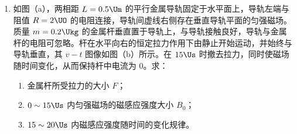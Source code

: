 \documentclass[\gkver]{gaokaozhenti}
\begin{document}
\begin{enumerate}
{（2）设拉力作用时间为 $t$，在此过程中球上升 $h$，末速度为 $v$，则 $h=\frac{1}{2}at^{2}$，$v=at$，由题意有 $-h=vt-\frac{1}{2}gt^{2}$，解得 $a=\frac{1}{3}g$，根据牛顿定律 $F-mg=ma$，解得 $F=\frac{4}{3}mg$。

（3）动能为 $\frac{W}{5}$ 时球的位置可能在 $h$ 的下方或上方。设球的位置在 $h$ 下方离地 $h'$ 处，$(F-mg)h'=\frac{1}{5}W$，而 $(F-mg)h=\frac{1}{4}W$，解得 $h'=\frac{4}{5}h$，重力势能 $E_{p}=mgh'=\frac{3}{5}W$。设球的位置在 $h$ 上方离地 $h''$ 处，由机械能守恒 $\frac{1}{5}W+mgh''=W$，因此 $E_{p}=mgh''=\frac{4}{5}W$。
}

\item
如图（a），两相距 $L=0.5\Um$ 的平行金属导轨固定于水平面上，导轨左端与阻值 $R=2\UO$ 的电阻连接，导轨间虚线右侧存在垂直导轨平面的匀强磁场。质量 $m=0.2\Ukg$ 的金属杆垂直置于导轨上，与导轨接触良好，导轨与金属杆的电阻可忽略。杆在水平向右的恒定拉力作用下由静止开始运动，并始终与导轨垂直，其 $v-t$ 图像如图（b）所示。在 $15\Us$ 时撤去拉力，同时使磁场随时间变化，从而保持杆中电流为 0。求：
\begin{enumerate}
	\item
	金属杆所受拉力的大小 $F$；

	\item
	$0\sim15\Us$ 内匀强磁场的磁感应强度大小 $B_{0}$；

	\item
	$15\sim20\Us$ 内磁感应强度随时间的变化规律。
\end{enumerate}

\twopicture[numA={（a）}, numB={（b）}, labelA=2015上海32a, labelB=2015上海32b, hA=3.00cm, hB=3.00cm]
{}
{}

\end{enumerate}
\end{document}
